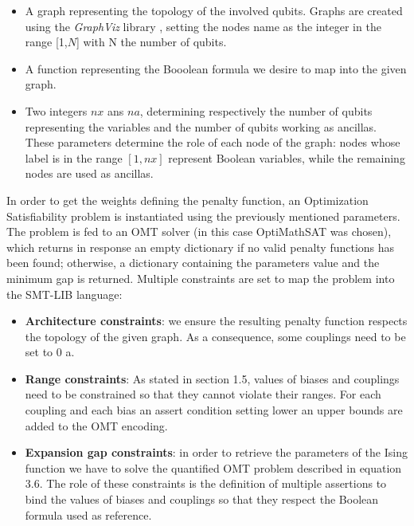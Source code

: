 \begin{itemize}
    \item A graph representing the topology of the involved qubits. Graphs are created using the \textit{GraphViz} library \cite{graphviz}, setting the nodes name as the integer in the range [1,$N$] with N the number of qubits. 
    \item A function representing the Booolean formula we desire to map into the given graph.
    \item Two integers $nx$ ans $na$, determining respectively the number of qubits representing the variables and the number of qubits working as ancillas. These parameters determine the role of each node of the graph: nodes whose label is in the range $[1, nx]$ represent Boolean variables, while the remaining nodes are used as ancillas.
\end{itemize}

In order to get the weights defining the penalty function, an Optimization Satisfiability problem is instantiated using the previously mentioned parameters. The problem is fed to an OMT solver (in this case OptiMathSAT was chosen), which returns in response an empty dictionary if no valid penalty functions has been found; otherwise, a dictionary containing the parameters value and the minimum gap is returned. Multiple constraints are set to map the problem into the SMT-LIB language:
 
\begin{itemize}
    \item \textbf{Architecture constraints}: we ensure the resulting penalty function respects the topology of the given graph. As a consequence, some couplings need to be set to 0 a.
    \item \textbf{Range constraints}: As stated in section 1.5, values of biases and couplings need to be constrained so that they cannot violate their ranges. For each coupling and each bias an assert condition setting lower an upper bounds are added to the OMT encoding.
    \item \textbf{Expansion gap constraints}: in order to retrieve the parameters of the Ising function we have to solve the  quantified OMT problem described in equation 3.6. The role of these constraints is the definition of multiple assertions to bind the values of biases and couplings so that they respect the Boolean formula used as reference.
\end{itemize}

